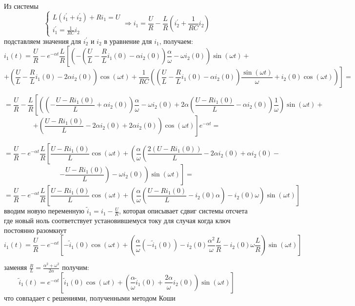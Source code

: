 \documentclass[a4paper,12pt]{article}
\begin{document}
Из системы 
$$
\left\{
\begin{array}{lcl}
	L(i_1^\prime + i_2^\prime) + Ri_1 = U\\[1.5mm]
	i_1^\prime = \frac{1}{RC} i_2
\end{array}\right. \Rightarrow
i_1 = \frac{U}{R} - \frac{L}{R}\left(i_2^\prime + \frac{1}{RC}i_2\right)
$$
подставляем значения для $i_2^\prime$ и $i_2$ в уравнение для $i_1$, получаем:
$$
i_1(t) = \frac{U}{R} - e^{-\alpha t}\frac{L}{R}\left[\left(-\left(\frac{U}{L}-\frac{R}{L}i_1(0) 
- \alpha i_2(0)\right)\frac{\alpha}{\omega}  -\omega i_2(0)\right)\sin(\omega t)\right. +
$$
$$
+\!\left.\left(\!\frac{U}{L}-\frac{R}{L}i_1(0) -2\alpha i_2(0)\!\right)\!\cos(\omega t)
 +
\frac{1}{RC}\!\left(\!\!\left(\frac{U}{L} - \frac{R}{L}i_1(0) -\alpha i_2(0)\!\right)\!\frac{\sin(\omega t)}{\omega}
+i_2(0)\cos(\omega t)\right)
\right]=
$$


$$
= \frac{U}{R} - \frac{L}{R} \!\left[\left(\!\!\left(-\frac{U-Ri_1(0)}{L} + \alpha i_2(0) %
\!\right)\!\frac{\alpha}{\omega} -\omega i_2(0)+ 2\alpha \left(\frac{U - Ri_1(0)}{L} - \alpha i_2(0)\right)\frac{1}{\omega}
\!\right)\sin(\omega t)\right. +
$$
$$
+ \left.\left(\frac{U -Ri_1(0)}{L} - 2\alpha i_2(0) + 2\alpha i_2(0) \right)\cos(\omega t)\right]
e^{-\alpha t} =
$$

$$
=\frac{U}{R} - e^{-\alpha t}\frac{L}{R}\left[\frac{U-Ri_1(0)}{L}\cos(\omega t) +
\left(\frac{\alpha}{\omega} \left( \frac{2(U-Ri_1(0))}{L}  -2 \alpha i_2(0) + \alpha i_2(0) 
\right.\right.\right. -
$$
$$
-\left.\left.\left.\frac{U-Ri_1(0)}{L}\right) 
-\omega i_2(0)\right)\sin(\omega t)\right] =
$$
$$
=\frac{U}{R} - e^{-\alpha t} \frac{L}{R}\left[\frac{U-Ri_1(0)}{L}\cos(\omega t) +
\left(\frac{\alpha}{\omega}
\left(\frac{U-Ri_1(0)}{L} - i_2(0)\alpha\right) - i_2(0)\omega
\right)\sin(\omega t) 
\right]
$$
вводим новую переменную $\tilde{i}_1 = i_1 - \frac{U}{R}$, которая описывает сдвиг системы отсчета где новый ноль соответствует установившемуся току для случая когда ключ постоянно разомкнут
$$
i_1(t)=\frac{U}{R} - e^{-\alpha t} \left[ -\tilde{i}_1(0)\cos(\omega t)  + 
\left( \frac{\alpha}{\omega}\left(-\tilde{i}_1(0)\right) -i_2(0)\frac{\alpha^2}{\omega}\frac{L}{R}
- i_2(0)\omega\frac{L}{R} \right)\sin(\omega t ) %
\right]
$$

заменяя $\frac{R}{L}=\frac{\alpha^2 + \omega^2}{2\alpha}$ получим:
$$
\tilde{i}_1(t) = e^{-\alpha t}\left[ \tilde{i}_1(0)\cos(\omega t) + \left(\frac{\alpha}{\omega}\tilde{i}_1(0) + 
\frac{2\alpha}{\omega} i_2(0)\right) \sin(\omega t)\right]
$$
что совпадает с решениями, полученными методом Коши
\end{document}
